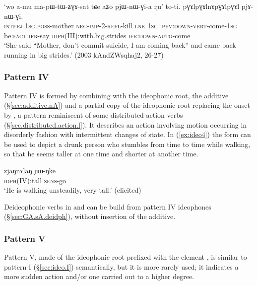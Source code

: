 \begin{exe} 
\ex \label{ex:pGAlnApGAl}
\gll `wo a-mu ma-pɯ-tɯ-ʑɣɤ-sat tɕe aʑo pjɯ-nɯ-ɣi-a ŋu' to-ti. pɣɤlpɣɤlnɤpɣɤlpɣɤl pjɤ-nɯ-ɣi. \\
\textsc{interj} \textsc{1sg}.\textsc{poss}-mother \textsc{neg}-\textsc{imp}-2-\textsc{refl}-kill \textsc{lnk} \textsc{1sg} \textsc{ipfv}:\textsc{down}-\textsc{vert}-come-\textsc{1sg} be:\textsc{fact} \textsc{ifr}-say \textsc{idph}(III):with.big.strides \textsc{ifr}:\textsc{down}-\textsc{auto}-come \\
\glt `She said ``Mother, don't commit suicide, I am coming back'' and came back running in big strides.' (2003 kAndZWsqhaj2, 26-27)
\end{exe} 
 
 
   \subsubsection{Pattern IV} \label{sec:ideo.IV}
Pattern IV is formed by combining with the ideophonic root, the additive  (§\ref{sec:additive.nA}) and a partial copy of the ideophonic root replacing the onset by , a pattern reminiscent of some distributed action verbs (§\ref{sec.distributed.action.l}). It describes an action involving motion  occurring in disorderly fashion with intermittent changes of state. In (\ref{ex:ideo4}) the form   can be used to depict a drunk person who stumbles from time to time while walking, so that he seems taller at one time and shorter at another time.
 
  \begin{exe} 
\ex  \label{ex:ideo4}
\gll  zjaŋnɤlaŋ ɲɯ-ŋke   \\
     \textsc{idph}(IV):tall \textsc{sens}-go  \\
\glt `He is walking unsteadily, very tall.'   (elicited)
 \end{exe} 
 
Deideophonic verbs in  and  can be build from pattern IV ideophones (§\ref{sec:GA.sA.deidph}), without insertion of the additive.

\subsubsection{Pattern V} \label{sec:ideo.V}
 Pattern V, made of the ideophonic root prefixed with the element , is similar to pattern I (§\ref{sec:ideo.I}) semantically, but it is more rarely used; it indicates a more sudden action and/or one carried out to a higher degree.
 
